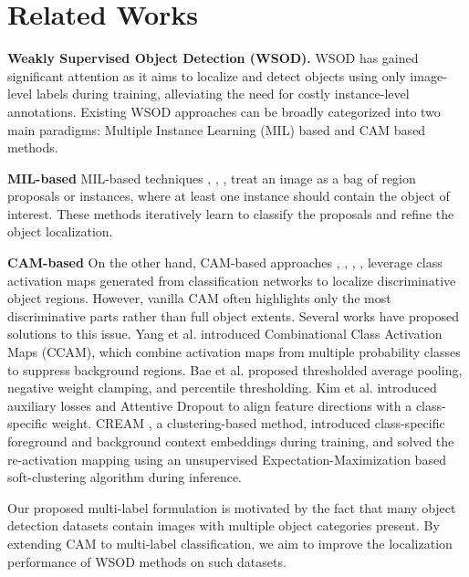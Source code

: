 \documentclass[conference]{IEEEtran}
\begin{document}
\section{Related Works}
\textbf{Weakly Supervised Object Detection (WSOD).} WSOD has gained significant attention as it aims to localize and detect objects using only image-level labels during training, alleviating the need for costly instance-level annotations. Existing WSOD approaches can be broadly categorized into two main paradigms: Multiple Instance Learning (MIL) based and CAM based methods.

\textbf{MIL-based}
MIL-based techniques \cite{DBLP:journals/corr/BilenV15}, \cite{tang2017multiple}, \cite{wang2022d2df2wod}, \cite{huang2022w2nswitching} treat an image as a bag of region proposals or instances, where at least one instance should contain the object of interest. These methods iteratively learn to classify the proposals and refine the object localization.

\textbf{CAM-based}
On the other hand, CAM-based approaches \cite{zhou2015cnnlocalization}, \cite{yang2019combinational}, \cite{Bae:2020:RethinkingCAM}, \cite{kim2022bridging}, \cite{xu2022creamweaklysupervisedobject} leverage class activation maps generated from classification networks to localize discriminative object regions. However, vanilla CAM often highlights only the most discriminative parts rather than full object extents. Several works have proposed solutions to this issue. Yang et al. \cite{yang2019combinational} introduced Combinational Class Activation Maps (CCAM), which combine activation maps from multiple probability classes to suppress background regions. Bae et al. \cite{Bae:2020:RethinkingCAM} proposed thresholded average pooling, negative weight clamping, and percentile thresholding. Kim et al. \cite{kim2022bridging} introduced auxiliary losses and Attentive Dropout to align feature directions with a class-specific weight.  CREAM \cite{xu2022creamweaklysupervisedobject}, a clustering-based method, introduced class-specific foreground and background context embeddings during training, and solved the re-activation mapping using an unsupervised Expectation-Maximization based soft-clustering algorithm during inference.

Our proposed multi-label formulation is motivated by the fact that many object detection datasets contain images with multiple object categories present. By extending CAM to multi-label classification, we aim to improve the localization performance of WSOD methods on such datasets.
\end{document}
